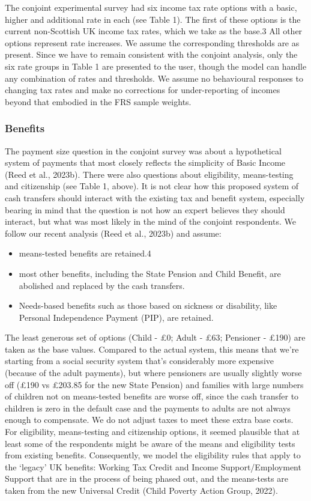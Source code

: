 \documentclass[
  letterpaper,
  DIV=11,
  numbers=noendperiod]{scrartcl}
\providecommand{\tightlist}{%
  \setlength{\itemsep}{0pt}\setlength{\parskip}{0pt}}\usepackage{longtable,booktabs,array}
\begin{document}
The conjoint experimental survey had six income tax rate options with a
basic, higher and additional rate in each (see Table 1). The first of
these options is the current non-Scottish UK income tax rates, which we
take as the base.3 All other options represent rate increases. We assume
the corresponding thresholds are as present. Since we have to remain
consistent with the conjoint analysis, only the six rate groups in Table
1 are presented to the user, though the model can handle any combination
of rates and thresholds. We assume no behavioural responses to changing
tax rates and make no corrections for under-reporting of incomes beyond
that embodied in the FRS sample weights.

\subsubsection{Benefits}\label{benefits}

The payment size question in the conjoint survey was about a
hypothetical system of payments that most closely reflects the
simplicity of Basic Income (Reed et al., 2023b). There were also
questions about eligibility, means-testing and citizenship (see Table 1,
above). It is not clear how this proposed system of cash transfers
should interact with the existing tax and benefit system, especially
bearing in mind that the question is not how an expert believes they
should interact, but what was most likely in the mind of the conjoint
respondents. We follow our recent analysis (Reed et al., 2023b) and
assume:

\begin{itemize}
\tightlist
\item
  means-tested benefits are retained.4
\item
  most other benefits, including the State Pension and Child Benefit,
  are abolished and replaced by the cash transfers.
\item
  Needs-based benefits such as those based on sickness or disability,
  like Personal Independence Payment (PIP), are retained.
\end{itemize}

The least generous set of options (Child - £0; Adult - £63; Pensioner -
£190) are taken as the base values. Compared to the actual system, this
means that we're starting from a social security system that's
considerably more expensive (because of the adult payments), but where
pensioners are usually slightly worse off (£190 vs £203.85 for the new
State Pension) and families with large numbers of children not on
means-tested benefits are worse off, since the cash transfer to children
is zero in the default case and the payments to adults are not always
enough to compensate. We do not adjust taxes to meet these extra base
costs. For eligibility, means-testing and citizenship options, it seemed
plausible that at least some of the respondents might be aware of the
means and eligibility tests from existing benefits. Consequently, we
model the eligibility rules that apply to the `legacy' UK benefits:
Working Tax Credit and Income Support/Employment Support that are in the
process of being phased out, and the means-tests are taken from the new
Universal Credit (Child Poverty Action Group, 2022).
\end{document}
